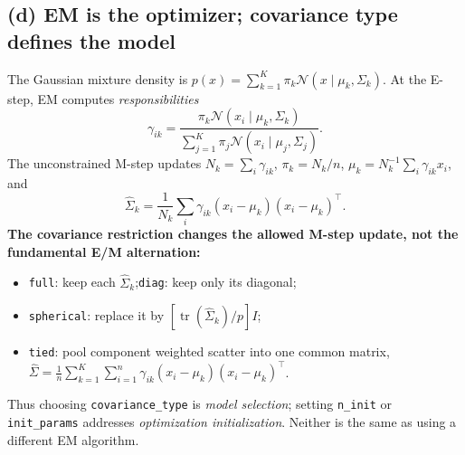 \subsection*{(d) EM is the optimizer; covariance type defines the model}
The Gaussian mixture density is $p(x)=\sum_{k=1}^{K}\pi_k\mathcal N(x\mid\mu_k,\Sigma_k)$. At the E-step, EM computes \emph{responsibilities}
\[
\gamma_{ik}=\frac{\pi_k\mathcal N(x_i\mid\mu_k,\Sigma_k)}{\sum_{j=1}^{K}\pi_j\mathcal N(x_i\mid\mu_j,\Sigma_j)}.
\]
The unconstrained M-step updates $N_k=\sum_i\gamma_{ik}$, $\pi_k=N_k/n$, $\mu_k=N_k^{-1}\sum_i\gamma_{ik}x_i$, and
\[
\widehat\Sigma_k=\frac1{N_k}\sum_i\gamma_{ik}(x_i-\mu_k)(x_i-\mu_k)^\top.
\]
\textbf{The covariance restriction changes the allowed M-step update, not the fundamental E/M alternation:}
\begin{itemize}
\item \texttt{full}: keep each $\widehat\Sigma_k$;\quad \texttt{diag}: keep only its diagonal;
\item \texttt{spherical}: replace it by $[\operatorname{tr}(\widehat\Sigma_k)/p]I$;
\item \texttt{tied}: pool component weighted scatter into one common matrix,
$\displaystyle\widehat\Sigma=\frac1n\sum_{k=1}^{K}\sum_{i=1}^{n}\gamma_{ik}(x_i-\mu_k)(x_i-\mu_k)^\top$.
\end{itemize}
Thus choosing \texttt{covariance\_type} is \emph{model selection}; setting \texttt{n\_init} or \texttt{init\_params} addresses \emph{optimization initialization}. Neither is the same as using a different EM algorithm.

